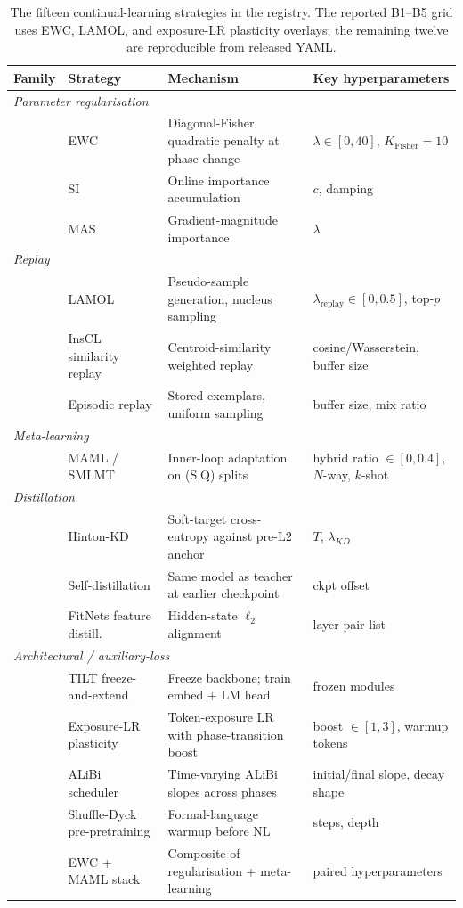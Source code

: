 \begin{table}[t]
\centering
\small
\setlength{\tabcolsep}{3.5pt}
\begin{tabular}{llll}
\toprule
\textbf{Family} & \textbf{Strategy} & \textbf{Mechanism} & \textbf{Key hyperparameters} \\
\midrule
\multicolumn{4}{l}{\textit{Parameter regularisation}} \\
& EWC \citep{kirkpatrick2017overcoming} & Diagonal-Fisher quadratic penalty at phase change & $\lambda\in[0,40]$, $K_{\text{Fisher}}=10$ \\
& SI & Online importance accumulation & $c$, damping \\
& MAS & Gradient-magnitude importance & $\lambda$ \\
\midrule
\multicolumn{4}{l}{\textit{Replay}} \\
& LAMOL \citep{sun2020lamol} & Pseudo-sample generation, nucleus sampling & $\lambda_{\text{replay}}\in[0,0.5]$, top-$p$ \\
& InsCL similarity replay & Centroid-similarity weighted replay & cosine/Wasserstein, buffer size \\
& Episodic replay & Stored exemplars, uniform sampling & buffer size, mix ratio \\
\midrule
\multicolumn{4}{l}{\textit{Meta-learning}} \\
& MAML / SMLMT & Inner-loop adaptation on (S,Q) splits & hybrid ratio $\in[0,0.4]$, $N$-way, $k$-shot \\
\midrule
\multicolumn{4}{l}{\textit{Distillation}} \\
& Hinton-KD & Soft-target cross-entropy against pre-L2 anchor & $T$, $\lambda_{KD}$ \\
& Self-distillation & Same model as teacher at earlier checkpoint & ckpt offset \\
& FitNets feature distill. & Hidden-state $\ell_2$ alignment & layer-pair list \\
\midrule
\multicolumn{4}{l}{\textit{Architectural / auxiliary-loss}} \\
& TILT freeze-and-extend & Freeze backbone; train embed + LM head & frozen modules \\
& Exposure-LR plasticity & Token-exposure LR with phase-transition boost & boost $\in[1,3]$, warmup tokens \\
& ALiBi scheduler & Time-varying ALiBi slopes across phases & initial/final slope, decay shape \\
& Shuffle-Dyck pre-pretraining & Formal-language warmup before NL & steps, depth \\
& EWC + MAML stack & Composite of regularisation + meta-learning & paired hyperparameters \\
\bottomrule
\end{tabular}
\caption{The fifteen continual-learning strategies in the \beetle{} registry. The reported B1--B5 grid uses EWC, LAMOL, and exposure-LR plasticity overlays; the remaining twelve are reproducible from released YAML.}
\label{tab:cl-registry}
\end{table}

